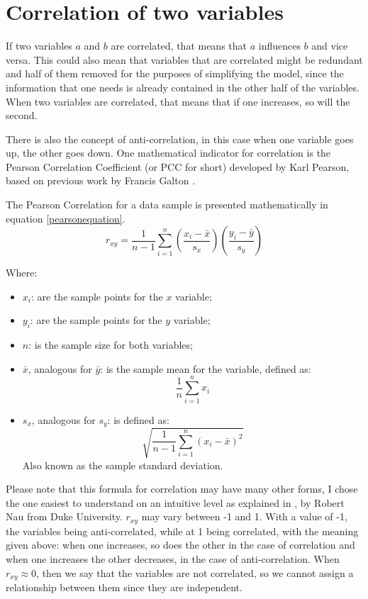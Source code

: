 \documentclass[12pt,a4paper,titlepage]{report}
\begin{document}
\section{Correlation of two variables}

If two variables $ a $ and $ b $ are correlated, that means that $ a $ influences $ b $ and vice versa. This could also mean that variables that are correlated might be redundant and half of them removed for the purposes of simplifying the model, since the information that one needs is already contained in the other half of the variables. When two variables are correlated, that means that if one increases, so will the second.

There is also the concept of anti-correlation, in this case when one variable goes up, the other goes down. One mathematical indicator for correlation is the Pearson Correlation Coefficient (or PCC for short) \cite{pearson1895note} developed by Karl Pearson, based on previous work by Francis Galton \cite{stiglercorrelationgalton}.

The Pearson Correlation for a data sample is presented mathematically in equation \ref{pearsonequation}.
\begin{equation}
r_{xy} = \frac{1}{n-1}\sum_{i=1}^{n}\left(\frac{x_{i}-\bar{x}}{s_{x}}\right)\left(\frac{y_{i}-\bar{y}}{s_{y}}\right)
\label{pearsonequation}
\end{equation}

Where:
\begin{itemize}
    \item $ x_{i} $: are the sample points for the $ x $ variable;
    \item $ y_{i} $: are the sample points for the $ y $ variable;
    \item $ n $: is the sample size for both variables;
    \item $ \bar{x} $, analogous for $ \bar{y} $: is the sample mean for the variable, defined as:
    \[\frac{1}{n}\sum_{i=1}^{n}x_{i}\]
    \item $ s_{x} $, analogous for $ s_{y} $: is defined as: 
    \[\sqrt{\frac{1}{n-1}\sum_{i=1}^{n}(x_{i}-\bar{x})^2}\]
    Also known as the sample standard deviation.
\end{itemize}
Please note that this formula for correlation may have many other forms, I chose the one easiest to understand on an intuitive level as explained in \cite{nauregression}, by Robert Nau from Duke University. 
$ r_{xy} $ may vary between -1 and 1. With a value of -1, the variables being anti-correlated, while at 1 being correlated, with the meaning given above: when one increases, so does the other in the case of correlation and when one increases the other decreases, in the case of anti-correlation. When $ r_{xy} \approx 0 $, then we say that the variables are not correlated, so we cannot assign a relationship between them since they are independent.
\end{document}
